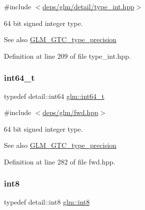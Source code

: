 {\ttfamily \#include $<$\hyperlink{type__int_8hpp}{deps/glm/detail/type\+\_\+int.\+hpp}$>$}

64 bit signed integer type. \begin{DoxySeeAlso}{See also}
\hyperlink{group__gtc__type__precision}{G\+L\+M\+\_\+\+G\+T\+C\+\_\+type\+\_\+precision} 
\end{DoxySeeAlso}


Definition at line 209 of file type\+\_\+int.\+hpp.

\mbox{\label{group__gtc__type__precision_ga6abb23fbf4e39c50ec5341160b5da5ab}} 
\subsubsection{\texorpdfstring{int64\+\_\+t}{int64\_t}}
{\footnotesize\ttfamily typedef detail\+::int64 \hyperlink{group__gtc__type__precision_ga6abb23fbf4e39c50ec5341160b5da5ab}{glm\+::int64\+\_\+t}}



{\ttfamily \#include $<$\hyperlink{fwd_8hpp}{deps/glm/fwd.\+hpp}$>$}

64 bit signed integer type. \begin{DoxySeeAlso}{See also}
\hyperlink{group__gtc__type__precision}{G\+L\+M\+\_\+\+G\+T\+C\+\_\+type\+\_\+precision} 
\end{DoxySeeAlso}


Definition at line 282 of file fwd.\+hpp.

\mbox{\label{group__gtc__type__precision_ga96254f9c1c4506fc8eb5cf3301ce8565}} 
\subsubsection{\texorpdfstring{int8}{int8}}
{\footnotesize\ttfamily typedef detail\+::int8 \hyperlink{group__gtc__type__precision_ga96254f9c1c4506fc8eb5cf3301ce8565}{glm\+::int8}}



